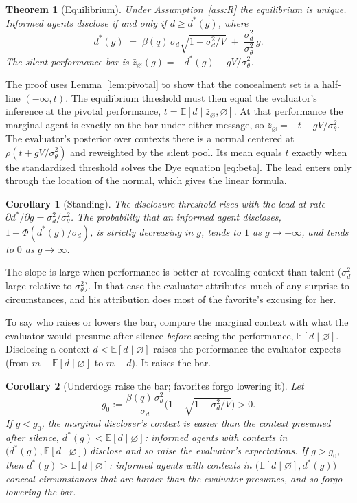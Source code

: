 \documentclass[11pt]{article}
\newtheorem{theorem}{Theorem}
\newtheorem{corollary}{Corollary}
\theoremstyle{definition}
\newcommand{\E}{\mathbb{E}}
\newcommand{\sil}{\varnothing}
\newcommand{\sd}{\sigma_d}
\newcommand{\sth}{\sigma_\theta}
\begin{document}
\begin{theorem}[Equilibrium]\label{thm:main}
Under Assumption~\ref{ass:R} the equilibrium is unique. Informed agents disclose if and only if $d\ge d^*(g)$, where
\begin{equation}\label{eq:dstar}
d^*(g)\;=\;\beta(q)\,\sd\sqrt{1+\sd^2/V}\;+\;\frac{\sd^2}{\sth^2}\,g .
\end{equation}
The silent performance bar is $\bar z_\sil(g)=-d^*(g)-gV/\sth^2$.
\end{theorem}

The proof uses Lemma~\ref{lem:pivotal} to show that the concealment set is a half-line $(-\infty,t)$. The equilibrium threshold must then equal the evaluator's inference at the pivotal performance, $t=\E[d\mid\bar z_\sil,\sil]$. At that performance the marginal agent is exactly on the bar under either message, so $\bar z_\sil=-t-gV/\sth^2$. The evaluator's posterior over contexts there is a normal centered at $\rho(t+gV/\sth^2)$ and reweighted by the silent pool. Its mean equals $t$ exactly when the standardized threshold solves the Dye equation \eqref{eq:beta}. The lead enters only through the location of the normal, which gives the linear formula.

\begin{corollary}[Standing]\label{cor:standing}
The disclosure threshold rises with the lead at rate $\partial d^*/\partial g=\sd^2/\sth^2$. The probability that an informed agent discloses, $1-\Phi(d^*(g)/\sd)$, is strictly decreasing in $g$, tends to $1$ as $g\to-\infty$, and tends to $0$ as $g\to\infty$.
\end{corollary}

The slope is large when performance is better at revealing context than talent ($\sd^2$ large relative to $\sth^2$). In that case the evaluator attributes much of any surprise to circumstances, and his attribution does most of the favorite's excusing for her.

To say who raises or lowers the bar, compare the marginal context with what the evaluator would presume after silence \emph{before} seeing the performance, $\E[d\mid\sil]$. Disclosing a context $d<\E[d\mid\sil]$ raises the performance the evaluator expects (from $m-\E[d\mid\sil]$ to $m-d$). It raises the bar.

\begin{corollary}[Underdogs raise the bar; favorites forgo lowering it]\label{cor:raise}
Let
\[
g_0:=\frac{\beta(q)\,\sth^2}{\sd}\Big(1-\sqrt{1+\sd^2/V}\Big)>0.
\]
If $g<g_0$, the marginal discloser's context is easier than the context presumed after silence, $d^*(g)<\E[d\mid\sil]$: informed agents with contexts in $\big(d^*(g),\E[d\mid\sil]\big)$ disclose and so raise the evaluator's expectations. If $g>g_0$, then $d^*(g)>\E[d\mid\sil]$: informed agents with contexts in $\big(\E[d\mid\sil],d^*(g)\big)$ conceal circumstances that are harder than the evaluator presumes, and so forgo lowering the bar.
\end{corollary}
\end{document}
